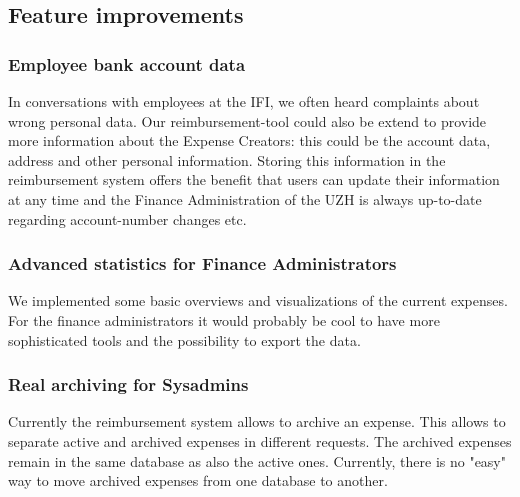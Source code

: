 \subsection{Feature improvements}
\subsubsection{Employee bank account data}In conversations with employees at the IFI, we often heard complaints about wrong personal data. Our reimbursement-tool could also be extend to provide more information about the Expense Creators: this could be the account data, address and other personal information. Storing this information in the reimbursement system offers the benefit that users can update their information at any time and the Finance Administration of the UZH is always up-to-date regarding account-number changes etc.

\subsubsection{Advanced statistics for Finance Administrators } 
We implemented some basic overviews and visualizations of the current expenses. For the finance administrators it would probably be cool to have more sophisticated tools and the possibility to export the data.

\subsubsection{Real archiving for Sysadmins} 
Currently the reimbursement system allows to archive an expense. This allows to separate active and archived expenses in different requests. The archived expenses remain in the same database as also the active ones. Currently, there is no "easy" way to move archived expenses from one database to another.
